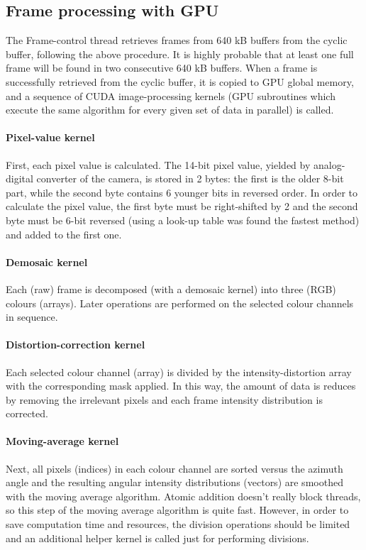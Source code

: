 \documentclass[preprint,review,12pt,dvips]{elsarticle}
\begin{document}
\subsection{Frame processing with GPU} The Frame-control thread retrieves frames from 640 kB buffers from the cyclic
buffer, following the above procedure. It is highly probable that at least one full frame will be found in two consecutive
640 kB buffers. When a frame is successfully retrieved from the cyclic buffer, it is copied to GPU global memory, and a
sequence of CUDA image-processing kernels (GPU subroutines which execute the same algorithm for every given set of data in
parallel) is called.

\paragraph{Pixel-value kernel} First, each pixel value is calculated. The 14-bit pixel value, yielded by
analog-digital converter of the camera, is stored in 2 bytes: the first is the older 8-bit part, while the second byte
contains 6 younger bits in reversed order. In order to calculate the pixel value, the first byte must be right-shifted by
2 and the second byte must be 6-bit reversed (using a look-up table was found the fastest method) and added to the first
one.

\paragraph{Demosaic kernel} Each (raw) frame is decomposed (with a demosaic kernel) into three (RGB) colours (arrays).
Later operations are performed on the selected colour channels in sequence.

\paragraph{Distortion-correction kernel} Each selected colour channel (array) is divided by the intensity-distortion array
with the corresponding mask applied. In this way, the amount of data is reduces by removing the irrelevant pixels and
each frame intensity distribution is corrected.

\paragraph{Moving-average kernel} Next, all pixels (indices) in each colour channel are sorted versus the azimuth angle
and the resulting angular intensity distributions (vectors) are smoothed with the moving average algorithm. Atomic
addition doesn't really block threads, so this step of the moving average algorithm is quite fast. However, in order to
save computation time and resources, the division operations should be limited and an additional helper kernel is called
just for performing divisions.
\end{document}
